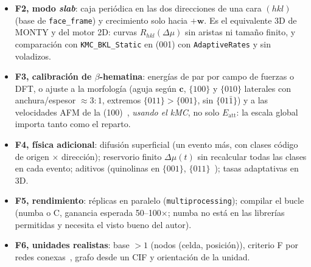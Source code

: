 \documentclass[11pt,a4paper]{article}
\newcommand{\code}[1]{\texttt{#1}}
\newcommand{\vect}[1]{\mathbf{#1}}
\newcommand{\Eatt}{E_{\mathrm{att}}}
\newcommand{\dmu}{\Delta\mu}
\newcommand{\bh}{$\beta$-hematina}
\begin{document}
\begin{itemize}
\item \textbf{F2, modo \emph{slab}}: caja periódica en las dos direcciones de una cara $(hkl)$ (base de
\code{face\_frame}) y crecimiento solo hacia $+\vect w$. Es el equivalente 3D de MONTY y del motor 2D:
curvas $R_{hkl}(\dmu)$ sin aristas ni tamaño finito, y comparación con \code{KMC\_BKL\_Static} en (001)
con \code{AdaptiveRates} y sin voladizos.
\item \textbf{F3, calibración de \bh{}}: energías de par por campo de fuerzas o DFT, o ajuste a la
morfología (aguja según $\vect c$, $\{100\}$ y $\{010\}$ laterales con anchura/espesor $\approx3{:}1$,
extremos $\{011\}>\{001\}$, sin $\{01\bar1\}$) y a las velocidades AFM de la (100)~\cite{olafson2015},
\emph{usando el kMC}, no solo $\Eatt$: la escala global importa tanto como el reparto.
\item \textbf{F4, física adicional}: difusión superficial (un evento más, con clases código de origen
$\times$ dirección); reservorio finito $\dmu(t)$ sin recalcular todas las clases en cada evento; aditivos
(quinolinas en $\{001\}$, $\{011\}$~\cite{solomonov2007}); tasas adaptativas en 3D.
\item \textbf{F5, rendimiento}: réplicas en paralelo (\code{multiprocessing}); compilar el bucle (numba o
C, ganancia esperada 50--100$\times$; numba no está en las librerías permitidas y necesita el visto bueno
del autor).
\item \textbf{F6, unidades realistas}: base $>1$ (nodos (celda, posición)), criterio F por redes
conexas~\cite{grimbergen1998}, grafo desde un CIF y orientación de la unidad.
\end{itemize}
\end{document}
